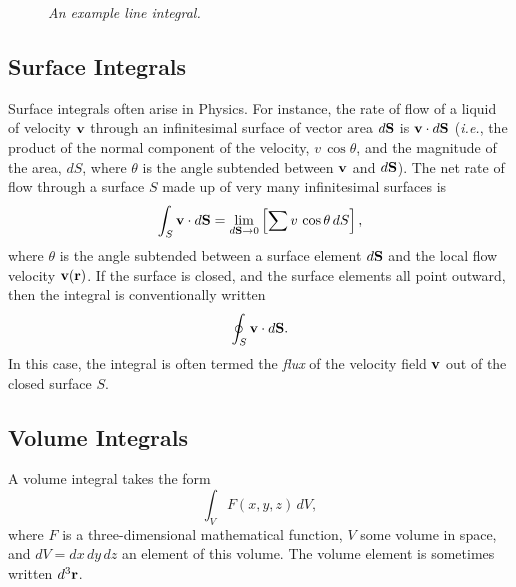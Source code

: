 \begin{figure}
\epsfysize=2.5in
\centerline{}
\caption{\em An example line integral.}\label{f2.14}
\end{figure}

\subsection{Surface Integrals}
Surface integrals often arise in Physics. For instance, the rate of
flow of a liquid of velocity ${\bf v}$ through an infinitesimal
 surface of vector area $d{\bf S}$
is ${\bf v} \cdot d{\bf S}$ ({\em i.e.}, the product of the normal component of the velocity, $v\,\cos\theta$, and the magnitude of the area, $dS$, where $\theta$ is the angle subtended between ${\bf v}$ and $d {\bf S}$). The net rate of flow through a surface $S$ made up
of
very many infinitesimal surfaces is 
\begin{equation}
\int_{S} {\bf v}\cdot d{\bf S} = \lim_{d{\bf S}\rightarrow 0}\left[ \sum v\,\cos\theta
\,dS\right],
\end{equation}
where $\theta$ is the angle subtended between a surface element $d{\bf S}$ and the local
flow velocity ${\bf v}({\bf r})$. If the surface is closed, and the surface elements all point outward, then the integral is conventionally written
\begin{equation}
\oint_{S} {\bf v}\cdot d{\bf S}.
\end{equation}
In this case, the integral is often termed the {\em flux}\/ of the velocity field
${\bf v}$ out of the closed surface $S$.

\subsection{Volume Integrals}
A volume integral takes the form
\begin{equation}
\int_V F(x,y,z)\,dV,
\end{equation}
where $F$ is a three-dimensional mathematical function, $V$  some volume in space, and $dV = dx \,dy \,dz$ an element of this volume. The
volume element is sometimes written $d^3{\bf r}$. 


